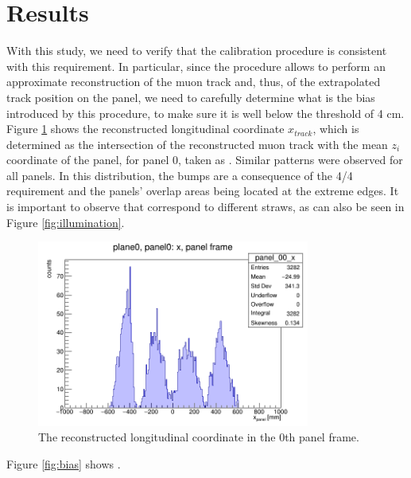 {\section{Results}

With this study, we need to verify that the 
calibration procedure is consistent with 
this requirement. In particular, since the 
procedure allows to perform an approximate reconstruction 
of the muon track and, thus, of the extrapolated track 
position on the panel, we need to carefully determine 
what is the bias introduced by this procedure,  
to make sure it is well below the threshold of 4 cm.  
Figure \ref{fig:recx} shows the reconstructed 
longitudinal coordinate $x_{track}$, which is 
determined as the intersection of the reconstructed 
muon track with the mean $z_i$ 
coordinate of the panel, for panel 0,  taken as .
Similar patterns were observed for all 
panels. In this distribution, the bumps 
are a consequence of the 4/4 
requirement and the panels' overlap areas 
being located at the extreme edges. 
It is important to observe that 
 correspond to different 
straws, as can also be seen in Figure 
\ref{fig:illumination}.
\begin{figure}[!h]
    \centering
    \includegraphics[width=0.8\textwidth]{figures/png/x_panel0.png}
    \caption[The reconstructed longitudinal coordinate in the 0th panel frame.]{The reconstructed longitudinal coordinate in the 0th panel frame.}
    \label{fig:recx}
\end{figure}
Figure \ref{fig:bias} shows .

}
